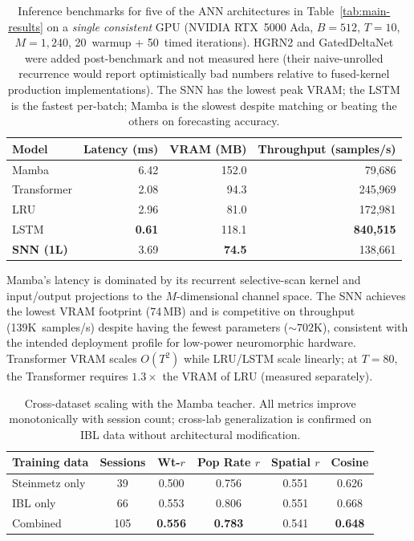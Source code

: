 \documentclass{article}
\begin{document}
\begin{table}[h]
  \caption{Inference benchmarks for five of the ANN architectures in
    Table~\ref{tab:main-results} on a \emph{single consistent} GPU
    (NVIDIA RTX~5000 Ada, $B{=}512$, $T{=}10$, $M{=}1{,}240$,
    20~warmup + 50~timed iterations).  HGRN2 and GatedDeltaNet were
    added post-benchmark and not measured here (their naive-unrolled
    recurrence would report optimistically bad numbers relative to
    fused-kernel production implementations).  The SNN has the lowest
    peak VRAM; the LSTM is the fastest per-batch; Mamba is the slowest
    despite matching or beating the others on forecasting accuracy.}
  \label{tab:efficiency}
  \centering
  \small
  \begin{tabular}{@{} l r r r @{}}
    \toprule
    \textbf{Model} & \textbf{Latency (ms)}
      & \textbf{VRAM (MB)} & \textbf{Throughput (samples/s)} \\
    \midrule
    Mamba         & 6.42 & 152.0           & 79{,}686  \\
    Transformer   & 2.08 &  94.3           & 245{,}969 \\
    LRU        & 2.96 &  81.0           & 172{,}981 \\
    LSTM          & \textbf{0.61} & 118.1  & \textbf{840{,}515} \\
    \textbf{SNN (1L)} & 3.69 & \textbf{74.5} & 138{,}661 \\
    \bottomrule
  \end{tabular}
\end{table}

Mamba's latency is dominated by its recurrent selective-scan kernel
and input/output projections to the $M$-dimensional channel space.
The SNN achieves the lowest VRAM footprint (74\,MB) and is competitive
on throughput (139K~samples/s) despite having the fewest parameters
(${\sim}702$K), consistent with the intended deployment profile for
low-power neuromorphic hardware.  Transformer VRAM scales $O(T^2)$
while LRU/LSTM scale linearly; at $T{=}80$, the Transformer requires
$1.3\times$ the VRAM of LRU (measured separately).

\begin{table}[h]
  \caption{Cross-dataset scaling with the Mamba teacher.  All metrics
    improve monotonically with session count; cross-lab generalization
    is confirmed on IBL data without architectural modification.}
  \label{tab:scaling}
  \centering
  \small
  \begin{tabular}{@{} l c c c c c @{}}
    \toprule
    \textbf{Training data} & \textbf{Sessions} & \textbf{Wt-$r$}
      & \textbf{Pop Rate $r$} & \textbf{Spatial $r$}
      & \textbf{Cosine} \\
    \midrule
    Steinmetz only & 39  & 0.500 & 0.756 & 0.551 & 0.626 \\
    IBL only       & 66  & 0.553 & 0.806 & 0.551 & 0.668 \\
    Combined       & 105 & \textbf{0.556} & \textbf{0.783}
      & 0.541 & \textbf{0.648} \\
    \bottomrule
  \end{tabular}
\end{table}
\end{document}

